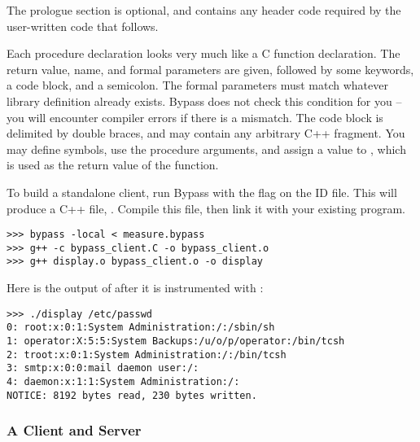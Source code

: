 The prologue section is optional, and contains any header code required by the user-written code that follows.

Each procedure declaration looks very much like a C function declaration.   The return value, name, and formal parameters are given, followed by some keywords, a code block, and a semicolon.  The formal parameters must match whatever library definition already exists.  Bypass does not check this condition for you -- you will encounter compiler errors if there is a mismatch.  The code block is delimited by double braces, and may contain any arbitrary C++ fragment.  You may define symbols, use the procedure arguments, and assign a value to , which is used as the return value of the function.


To build a standalone client, run Bypass with the  flag on the ID file.  This will produce a C++ file, .  Compile this file, then link it with your existing program.

\begin{verbatim}
>>> bypass -local < measure.bypass
>>> g++ -c bypass_client.C -o bypass_client.o
>>> g++ display.o bypass_client.o -o display
\end{verbatim}


Here is the output of  after it is instrumented with :

\begin{verbatim}
>>> ./display /etc/passwd
0: root:x:0:1:System Administration:/:/sbin/sh
1: operator:X:5:5:System Backups:/u/o/p/operator:/bin/tcsh
2: troot:x:0:1:System Administration:/:/bin/tcsh
3: smtp:x:0:0:mail daemon user:/:
4: daemon:x:1:1:System Administration:/:
NOTICE: 8192 bytes read, 230 bytes written.
\end{verbatim}

\subsubsection{A Client and Server}

